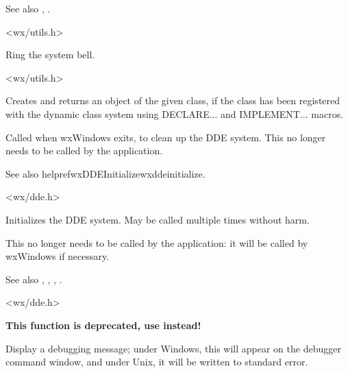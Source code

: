 See also , .


<wx/utils.h>



Ring the system bell.


<wx/utils.h>

\label{wxcreatedynamicobject}


Creates and returns an object of the given class, if the class has been
registered with the dynamic class system using DECLARE... and IMPLEMENT... macros.

\label{wxddecleanup}


Called when wxWindows exits, to clean up the DDE system. This no longer needs to be
called by the application.

See also helpref{wxDDEInitialize}{wxddeinitialize}.


<wx/dde.h>

\label{wxddeinitialize}


Initializes the DDE system. May be called multiple times without harm.

This no longer needs to be called by the application: it will be called
by wxWindows if necessary.

See also , , , 
.


<wx/dde.h>

\label{wxdebugmsg}


{\bf This function is deprecated, use  instead!}

Display a debugging message; under Windows, this will appear on the
debugger command window, and under Unix, it will be written to standard
error.

